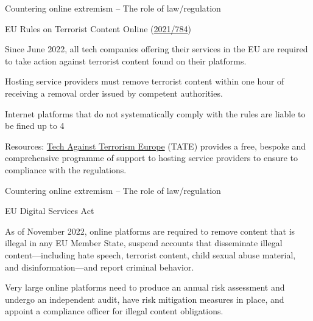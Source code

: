 \documentclass[nobackground,dvipsnames,table]{beamer}
\begin{document}
\begin{frame}{Countering online extremism – The role of law/regulation}

\small{
EU Rules on Terrorist Content Online (\href{https://eur-lex.europa.eu/legal-content/EN/TXT/HTML/?uri=CELEX:32021R0784\&from=EN}{2021/784})

\begin{itemize}
    \small{
    \item Since June 2022, all tech companies offering their services in the EU are required to take action against terrorist content found on their platforms. 
    \item Hosting service providers must remove terrorist content within one hour of receiving a removal order issued by competent authorities.
    \item Internet platforms that do not systematically comply with the rules are liable to be fined up to 4%
    \item Resources: \href{https://tate.techagainstterrorism.org/about}{Tech Against Terrorism Europe} (TATE) provides a free, bespoke and comprehensive programme of support to hosting service providers to ensure to compliance with the regulations.
    }
\end{itemize}

}
\end{frame}


\begin{frame}{Countering online extremism – The role of law/regulation}
\small{
EU Digital Services Act
\begin{itemize}
    \small{
    \item As of November 2022, online platforms are required to remove content that is illegal in any EU Member State, suspend accounts that disseminate illegal content---including hate speech, terrorist content, child sexual abuse material, and disinformation---and report criminal behavior.
    \item Very large online platforms need to produce an annual risk assessment and undergo an independent audit, have risk mitigation measures in place, and appoint a compliance officer for illegal content obligations. 
    }
\end{itemize}
}
\end{frame}
\end{document}
